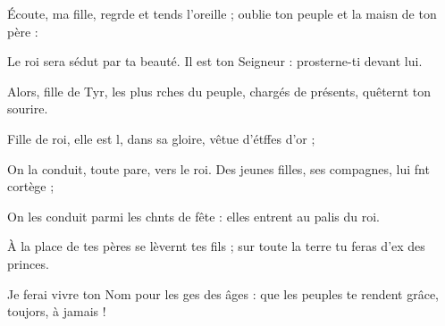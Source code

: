 \item Écoute, ma fille, regrde et tends l’oreille ;\psstar{} oublie ton peuple et la maisn de ton père :
\item Le roi sera sédut par ta beauté.\psstar{} Il est ton Seigneur : prosterne-ti devant lui.
\item Alors, fille de Tyr, les plus rches du peuple,\psstar{} chargés de présents, quêternt ton sourire.
\item Fille de roi, elle est l, dans sa gloire,\psstar{} vêtue d’étffes d’or ;
\item On la conduit, toute pare, vers le roi.\psstar{} Des jeunes filles, ses compagnes, lui fnt cortège ;
\item On les conduit parmi les chnts de fête :\psstar{} elles entrent au palis du roi.
\item À la place de tes pères se lèvernt tes fils ;\psstar{} sur toute la terre tu feras d’ex des princes.
\item Je ferai vivre ton Nom pour les ges des âges :\psstar{} que les peuples te rendent grâce, toujors, à jamais !